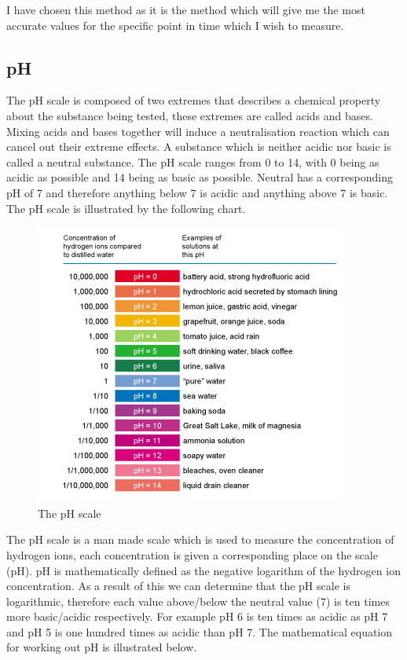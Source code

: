 I have chosen this method as it is the method which will give me the most accurate values for the specific point in time which I wish to measure. 






	\subsection{pH}

The pH scale is composed of two extremes that describes a chemical property about the substance being tested, these extremes are called acids and bases. Mixing acids and bases together will induce a neutralisation reaction which can cancel out their extreme effects. A substance which is neither acidic nor basic is called a neutral substance. The pH scale ranges from 0 to 14, with 0 being as acidic as possible and 14 being as basic as possible. Neutral has a corresponding pH of 7 and therefore anything below 7 is acidic and anything above 7 is basic. The pH scale is illustrated by the following chart.


\begin{figure}[H]
    \includegraphics[width=\textwidth]{./Planning/Images/pHScale.jpg}
    \caption{The pH scale} \label{fig:pH Scale}
\end{figure}

The pH scale is a man made scale which is used to measure the concentration of hydrogen ions, each concentration is given a corresponding place on the scale (pH). pH is mathematically defined as the negative logarithm of the hydrogen ion concentration. As a result of this we can determine that the pH scale is logarithmic, therefore each value above/below the neutral value (7) is ten times more basic/acidic respectively. For example pH 6 is ten times as acidic as pH 7  and pH 5 is one hundred times as acidic than pH 7. The mathematical equation for working out pH is illustrated below.

